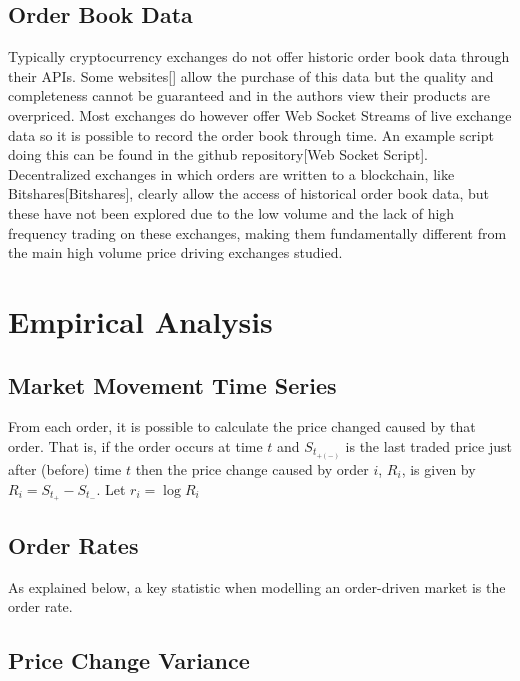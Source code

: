 \documentclass[a4paper,10pt]{article}
\begin{document}
\subsection{Order Book Data}
Typically cryptocurrency exchanges do not offer historic order book data through their APIs. Some websites[] allow the purchase of this data but the quality and completeness cannot be guaranteed and in the authors view their products are overpriced. Most exchanges do however offer Web Socket Streams of live exchange data so it is possible to record the order book through time. An example script doing this can be found in the github repository[Web Socket Script]. Decentralized exchanges in which orders are written to a blockchain, like Bitshares[Bitshares], clearly allow the access of historical order book data, but these have not been explored due to the low volume and the lack of high frequency trading on these exchanges, making them fundamentally different from the main high volume price driving exchanges studied. 
\section{Empirical Analysis}
\subsection{Market Movement Time Series}
From each order, it is possible to calculate the price changed caused by that order. That is, if the order occurs at time $t$ and $S_{t_{+(-)}}$ is the last traded price just after (before) time $t$ then the price change caused by order $i$, $R_i$, is given by $R_i = S_{t_{+}} - S_{t_{-}}$. Let $r_i = \log R_i$
\subsection{Order Rates}
As explained below, a key statistic when modelling an order-driven market is the order rate.
\subsection{Price Change Variance}
\end{document}
